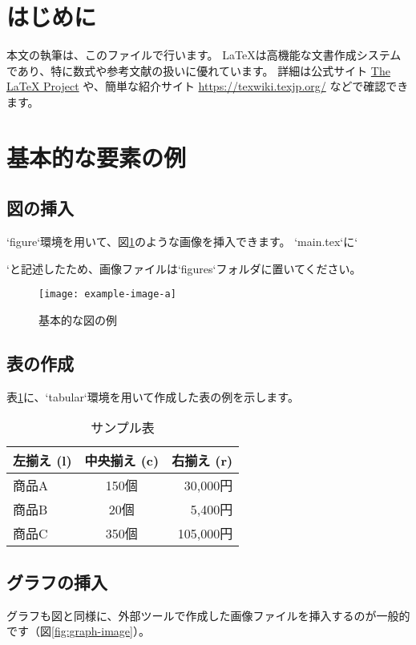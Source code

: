 

\section{はじめに}

本文の執筆は、このファイルで行います。
LaTeXは高機能な文書作成システムであり\cite{lamport1994}、特に数式や参考文献の扱いに優れています。
詳細は公式サイト \href{https://www.latex-project.org/}{The LaTeX Project} や、簡単な紹介サイト \url{https://texwiki.texjp.org/} などで確認できます。




\section{基本的な要素の例}

\subsection{図の挿入}
`figure`環境を用いて、図\ref{fig:sample}のような画像を挿入できます。
`main.tex`に`\graphicspath{{figures/}}`と記述したため、画像ファイルは`figures`フォルダに置いてください。

\begin{figure}[htbp]
  \centering
  \texttt{[image: example-image-a]}
  \caption{基本的な図の例}
  \label{fig:sample}
\end{figure}

\subsection{表の作成}
表\ref{tab:sample}に、`tabular`環境を用いて作成した表の例を示します。

\begin{table}[htbp]
  \centering
  \caption{サンプル表}
  \label{tab:sample}
  \begin{tabular}{|l|c|r|}
    \hline
    \textbf{左揃え (l)} & \textbf{中央揃え (c)} & \textbf{右揃え (r)} \\
    \hline
    商品A & 150個 & 30,000円 \\
    商品B & 20個 & 5,400円 \\
    商品C & 350個 & 105,000円 \\
    \hline
  \end{tabular}
\end{table}

\subsection{グラフの挿入}
グラフも図と同様に、外部ツールで作成した画像ファイルを挿入するのが一般的です（図\ref{fig:graph-image}）。

